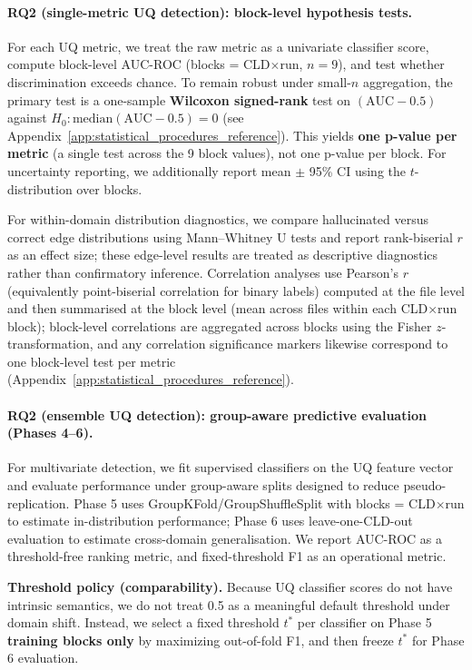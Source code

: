 \paragraph{RQ2 (single-metric UQ detection): block-level hypothesis tests.}
For each UQ metric, we treat the raw metric as a univariate classifier score, compute block-level AUC-ROC (blocks = CLD$\times$run, $n=9$), and test whether discrimination exceeds chance. To remain robust under small-$n$ aggregation, the primary test is a one-sample \textbf{Wilcoxon signed-rank} test on $(\mathrm{AUC}-0.5)$ against $H_0:\mathrm{median}(\mathrm{AUC}-0.5)=0$ (see Appendix~\ref{app:statistical_procedures_reference}). This yields \textbf{one p-value per metric} (a single test across the 9 block values), not one p-value per block. For uncertainty reporting, we additionally report mean $\pm$ 95\% CI using the $t$-distribution over blocks.

For within-domain distribution diagnostics, we compare hallucinated versus correct edge distributions using Mann--Whitney U tests and report rank-biserial $r$ as an effect size; these edge-level results are treated as descriptive diagnostics rather than confirmatory inference. Correlation analyses use Pearson's $r$ (equivalently point-biserial correlation for binary labels) computed at the file level and then summarised at the block level (mean across files within each CLD$\times$run block); block-level correlations are aggregated across blocks using the Fisher $z$-transformation, and any correlation significance markers likewise correspond to one block-level test per metric (Appendix~\ref{app:statistical_procedures_reference}).

\paragraph{RQ2 (ensemble UQ detection): group-aware predictive evaluation (Phases 4--6).}
For multivariate detection, we fit supervised classifiers on the UQ feature vector and evaluate performance under group-aware splits designed to reduce pseudo-replication. Phase 5 uses GroupKFold/GroupShuffleSplit with blocks = CLD$\times$run to estimate in-distribution performance; Phase 6 uses leave-one-CLD-out evaluation to estimate cross-domain generalisation. We report AUC-ROC as a threshold-free ranking metric, and fixed-threshold F1 as an operational metric.

\textbf{Threshold policy (comparability).} Because UQ classifier scores do not have intrinsic semantics, we do not treat 0.5 as a meaningful default threshold under domain shift. Instead, we select a fixed threshold $t^*$ per classifier on Phase 5 \textbf{training blocks only} by maximizing out-of-fold F1, and then freeze $t^*$ for Phase 6 evaluation.

